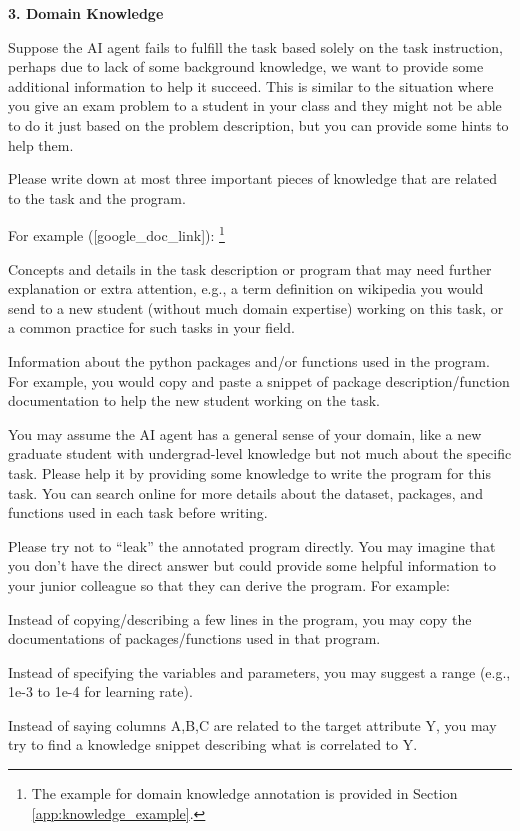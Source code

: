 \begin{tcolorbox}
\small
\textbf{3. Domain Knowledge}

Suppose the AI agent fails to fulfill the task based solely on the task instruction, perhaps due to lack of some background knowledge, we want to provide some additional information to help it succeed. This is similar to the situation where you give an exam problem to a student in your class and they might not be able to do it just based on the problem description, but you can provide some hints to help them. 

Please write down at most three important pieces of knowledge that are related to the task and the program. 

For example ([google\_doc\_link]): \footnote{The example for domain knowledge annotation is provided in Section \ref{app:knowledge_example}.}

Concepts and details in the task description or program that may need further explanation or extra attention, e.g., a term definition on wikipedia you would send to a new student (without much domain expertise) working on this task, or a common practice for such tasks in your field.

Information about the python packages and/or functions used in the program. For example,  you would copy and paste a snippet of package description/function documentation to help the new student working on the task. 

You may assume the AI agent has a general sense of your domain, like a new graduate student with undergrad-level knowledge but not much about the specific task. Please help it by providing some knowledge to write the program for this task. You can search online for more details about the dataset, packages, and functions used in each task before writing. 

Please try not to “leak” the annotated program directly. You may imagine that you don't have the direct answer but could provide some helpful information to your junior colleague so that they can derive the program. For example:

Instead of copying/describing a few lines in the program, you may copy the documentations of packages/functions used in that program.

Instead of specifying the variables and parameters, you may suggest a range (e.g., 1e-3 to 1e-4 for learning rate).

Instead of saying columns A,B,C are related to the target attribute Y, you may try to find a knowledge snippet describing what is correlated to Y.


\end{tcolorbox}
